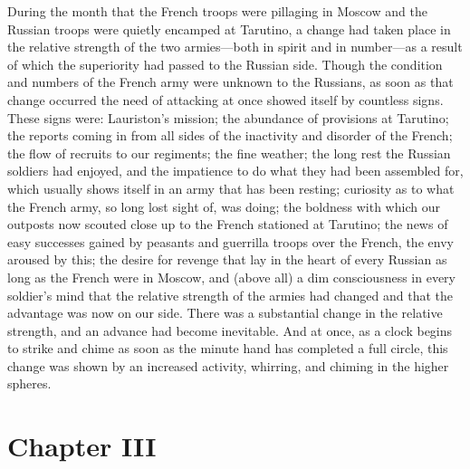 During the month that the French troops were pillaging in Moscow
and the Russian troops were quietly encamped at Tarutino, a
change had taken place in the relative strength of the two
armies---both in spirit and in number---as a result of which the
superiority had passed to the Russian side. Though the condition
and numbers of the French army were unknown to the Russians, as
soon as that change occurred the need of attacking at once showed
itself by countless signs. These signs were: Lauriston's mission;
the abundance of provisions at Tarutino; the reports coming in
from all sides of the inactivity and disorder of the French; the
flow of recruits to our regiments; the fine weather; the long
rest the Russian soldiers had enjoyed, and the impatience to do
what they had been assembled for, which usually shows itself in
an army that has been resting; curiosity as to what the French
army, so long lost sight of, was doing; the boldness with which
our outposts now scouted close up to the French stationed at
Tarutino; the news of easy successes gained by peasants and
guerrilla troops over the French, the envy aroused by this; the
desire for revenge that lay in the heart of every Russian as long
as the French were in Moscow, and (above all) a dim consciousness
in every soldier's mind that the relative strength of the armies
had changed and that the advantage was now on our side. There was
a substantial change in the relative strength, and an advance had
become inevitable. And at once, as a clock begins to strike and
chime as soon as the minute hand has completed a full circle,
this change was shown by an increased activity, whirring, and
chiming in the higher spheres.


\chapter*{Chapter III} \ifaudio {}
\fi

